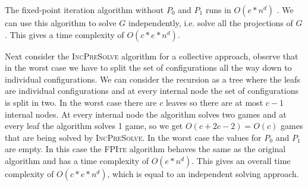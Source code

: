 The fixed-point iteration algorithm without $P_0$ and $P_1$ runs in $O(e*n^d)$ \cite{FPITE}. We can use this algorithm to solve $G$ independently, i.e. solve all the projections of $G$. This gives a time complexity of $O(c*e*n^d)$.

Next consider the \textsc{IncPreSolve} algorithm for a collective approach, observe that in the worst case we have to split the set of configurations all the way down to individual configurations. We can consider the recursion as a tree where the leafs are individual configurations and at every internal node the set of configurations is split in two. In the worst case there are $c$ leaves so there are at most $c-1$ internal nodes. At every internal node the algorithm solves two games and at every leaf the algorithm solves 1 game, so we get $O(c + 2c - 2) = O(c)$ games that are being solved by \textsc{IncPreSolve}. In the worst case the values for $P_0$ and $P_1$ are empty. In this case the \textsc{FPIte} algorithm behaves the same as the original algorithm and has a time complexity of $O(e*n^d)$. This gives an overall time complexity of $O(c*e*n^d)$, which is equal to an independent solving approach.
